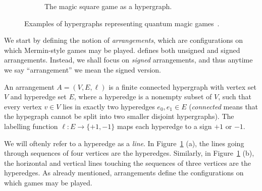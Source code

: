 \documentclass{llncs}
\begin{document}
\begin{figure}[htbp]
\begin{subfigure}[t]{0.49\textwidth}
\begin{center}
    \end{center}
    \caption{The magic square game as a hypergraph.}
  \end{subfigure}
  \caption{Examples of hypergraphs representing quantum magic games~\cite{arkhipov:2012}.\label{fig:as-graph}}
\end{figure}

We start by defining the notion of \emph{arrangements}, which are
configurations on which Mermin-style games may be
played. \cite{arkhipov:2012} defines both unsigned and signed
arrangements. Instead, we shall focus  on \emph{signed}
arrangements, and thus anytime we say ``arrangement'' we mean the
signed version.

\begin{definition}\label{def:arrangement}
  An arrangement \(A = (V, E, \ell)\) is a finite connected hypergraph
  with vertex set \(V\) and hyperedge set \(E\), where a hyperedge is
  a nonempty subset of \(V\), such that every vertex \(v \in V\) lies
  in exactly two hyperedges \(e_{0}, e_{1} \in E\) (\emph{connected}
  means that the hypegraph cannot be split into two smaller disjoint
  hypergraphs). The labelling function \(\ell\colon E \to \{+1, -1\}\)
  maps each hyperedge to a sign \(+1\) or \(-1\).
\end{definition}

We will oftenly refer to a hyperedge as a \emph{line}. In
Figure~\ref{fig:as-graph} (a), the lines going through sequences of
four vertices are the hyperedges. Similarly, in
Figure~\ref{fig:as-graph} (b), the horizontal and vertical lines
touching the sequences of three vertices are the hyperedges.  As
already mentioned, arrangements define the configurations on which
games may be played.
\end{document}
